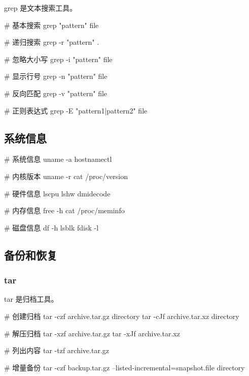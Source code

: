grep 是文本搜索工具。


\begin{lstcode}[numbers=none]
  # 基本搜索
  grep "pattern" file

  # 递归搜索
  grep -r "pattern" .

  # 忽略大小写
  grep -i "pattern" file

  # 显示行号
  grep -n "pattern" file

  # 反向匹配
  grep -v "pattern" file

  # 正则表达式
  grep -E "pattern1|pattern2" file
\end{lstcode}

\subsection{系统信息}


\begin{lstcode}[numbers=none]
  # 系统信息
  uname -a
  hostnamectl

  # 内核版本
  uname -r
  cat /proc/version

  # 硬件信息
  lscpu
  lshw
  dmidecode

  # 内存信息
  free -h
  cat /proc/meminfo

  # 磁盘信息
  df -h
  lsblk
  fdisk -l
\end{lstcode}

\subsection{备份和恢复}

\subsubsection{tar}

tar 是归档工具。


\begin{lstcode}[numbers=none]
  # 创建归档
  tar -czf archive.tar.gz directory
  tar -cJf archive.tar.xz directory

  # 解压归档
  tar -xzf archive.tar.gz
  tar -xJf archive.tar.xz

  # 列出内容
  tar -tzf archive.tar.gz

  # 增量备份
  tar -czf backup.tar.gz --listed-incremental=snapshot.file directory
\end{lstcode}

